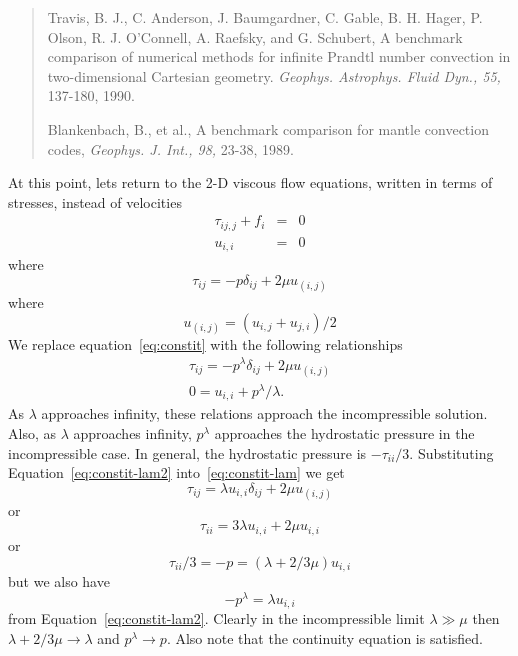 \documentclass{article}
\begin{document}
\begin{quotation}
\noindent 
Travis, B. J., C. Anderson, J. Baumgardner, C. Gable, B. H. Hager, P.
Olson, R. J. O'Connell, A. Raefsky, and G. Schubert, A benchmark comparison of
numerical methods for infinite Prandtl number convection in two-dimensional
Cartesian geometry.  {\em Geophys. Astrophys. Fluid Dyn., 55,} 137-180, 1990. 

\medskip
\noindent
Blankenbach, B., et al., A benchmark comparison for mantle convection codes, 
{\it Geophys. J. Int., 98,} 23-38, 1989. 
\end{quotation} 

At this point, lets return to the 2-D viscous flow equations, written in terms
of stresses, instead of velocities
\begin{eqnarray}  
\tau_{ij,j} + f_i & = & 0 \label{eq:motion}\\
u_{i,i} & = & 0 
\end{eqnarray}
where
\begin{equation}
\tau_{ij} = -p \delta_{ij} + 2 \mu u_{(i,j)} \label{eq:constit}
\end{equation}
where
\begin{equation}
u_{(i,j)} = (u_{i,j} + u_{j,i})/2
\end{equation}
We replace equation~\ref{eq:constit} with the following relationships 
\begin{eqnarray}
\tau_{ij} = -p^\lambda \delta_{ij} + 2 \mu u_{(i,j)} \label{eq:constit-lam} \\
0 = u_{i,i} + p^\lambda/\lambda. \label{eq:constit-lam2}
\end{eqnarray}
As $\lambda$ approaches infinity, these relations approach the incompressible
solution.  Also, as $\lambda$ approaches infinity, $p^\lambda$ approaches the
hydrostatic pressure in the incompressible case.   In general, the hydrostatic
pressure is $-\tau_{ii}/3$.  Substituting Equation~\ref{eq:constit-lam2}
into~\ref{eq:constit-lam} we get 
\begin{equation}
\tau_{ij} = \lambda u_{i,i} \delta_{ij} + 2 \mu u_{(i,j)}
\label{eq:constit-lam-final} 
\end{equation}
or 
\begin{equation}
\tau_{ii} = 3 \lambda u_{i,i} + 2 \mu u_{i,i}
\end{equation}
or
\begin{equation}
\tau_{ii}/3 = -p = (\lambda + 2/3 \mu) u_{i,i}
\end{equation}
but we also have 
\begin{equation}
-p^\lambda = \lambda u_{i,i}  
\end{equation}
from Equation~\ref{eq:constit-lam2}. Clearly in the incompressible limit
$\lambda \gg \mu$ then $\lambda + 2/3 \mu \rightarrow \lambda$ and $p^\lambda
\rightarrow p$.  Also note that the continuity equation is satisfied.
\end{document}

